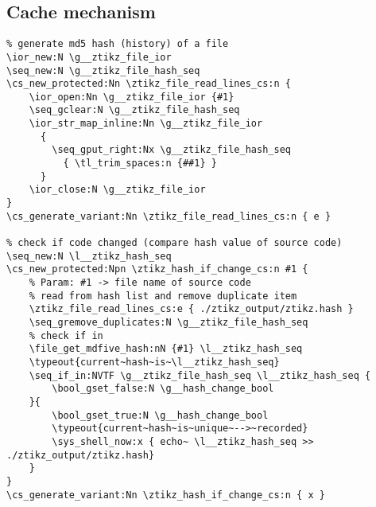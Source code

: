 \subsection{Cache mechanism}
\begin{verbatim}
% generate md5 hash (history) of a file
\ior_new:N \g__ztikz_file_ior
\seq_new:N \g__ztikz_file_hash_seq
\cs_new_protected:Nn \ztikz_file_read_lines_cs:n {
    \ior_open:Nn \g__ztikz_file_ior {#1}
    \seq_gclear:N \g__ztikz_file_hash_seq
    \ior_str_map_inline:Nn \g__ztikz_file_ior
      {
        \seq_gput_right:Nx \g__ztikz_file_hash_seq
          { \tl_trim_spaces:n {##1} }
      }
    \ior_close:N \g__ztikz_file_ior
}
\cs_generate_variant:Nn \ztikz_file_read_lines_cs:n { e }

% check if code changed (compare hash value of source code)
\seq_new:N \l__ztikz_hash_seq
\cs_new_protected:Npn \ztikz_hash_if_change_cs:n #1 {
    % Param: #1 -> file name of source code
    % read from hash list and remove duplicate item
    \ztikz_file_read_lines_cs:e { ./ztikz_output/ztikz.hash }
    \seq_gremove_duplicates:N \g__ztikz_file_hash_seq
    % check if in
    \file_get_mdfive_hash:nN {#1} \l__ztikz_hash_seq
    \typeout{current~hash~is~\l__ztikz_hash_seq}
    \seq_if_in:NVTF \g__ztikz_file_hash_seq \l__ztikz_hash_seq {
        \bool_gset_false:N \g__hash_change_bool
    }{
        \bool_gset_true:N \g__hash_change_bool
        \typeout{current~hash~is~unique~-->~recorded}
        \sys_shell_now:x { echo~ \l__ztikz_hash_seq >> ./ztikz_output/ztikz.hash}
    }
}
\cs_generate_variant:Nn \ztikz_hash_if_change_cs:n { x }
\end{verbatim}

